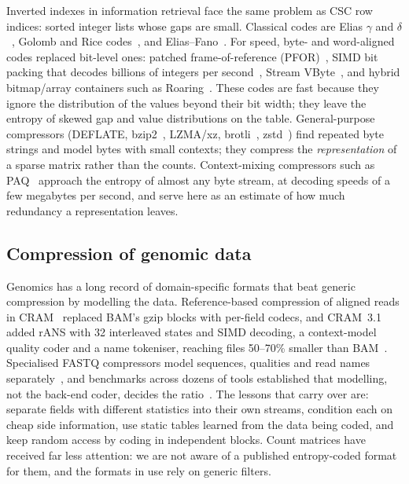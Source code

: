 Inverted indexes in information retrieval face the same problem as CSC row indices: sorted integer lists whose gaps
are small. Classical codes are Elias $\gamma$ and $\delta$~\cite{elias1975universal}, Golomb and Rice
codes~\cite{golomb1966run,rice1979some}, and Elias--Fano~\cite{vigna2013quasi}. For speed, byte- and word-aligned codes
replaced bit-level ones: patched frame-of-reference (PFOR)~\cite{zukowski2006super}, SIMD bit packing that decodes
billions of integers per second~\cite{lemire2015decoding}, Stream VByte~\cite{lemire2018stream}, and hybrid
bitmap/array containers such as Roaring~\cite{chambi2016better}. These codes are fast because they ignore the
distribution of the values beyond their bit width; they leave the entropy of skewed gap and value distributions on
the table. General-purpose compressors (DEFLATE, bzip2~\cite{burrows1994block}, LZMA/xz, brotli~\cite{alakuijala2016brotli},
zstd~\cite{collet2021zstd}) find repeated byte strings and model bytes with small contexts; they compress the
\emph{representation} of a sparse matrix rather than the counts. Context-mixing compressors such as
PAQ~\cite{mahoney2005adaptive} approach the entropy of almost any byte stream, at decoding speeds of a few megabytes per
second, and serve here as an estimate of how much redundancy a representation leaves.

\subsection{Compression of genomic data}

Genomics has a long record of domain-specific formats that beat generic compression by modelling the data. Reference-based
compression of aligned reads in CRAM~\cite{fritz2011efficient} replaced BAM's gzip blocks with per-field codecs, and
CRAM~3.1 added rANS with 32 interleaved states and SIMD decoding, a context-model quality coder and a name
tokeniser, reaching files 50--70\% smaller than BAM~\cite{bonfield2022cram}. Specialised FASTQ compressors model
sequences, qualities and read names separately~\cite{bonfield2013compression,chandak2019spring}, and benchmarks across
dozens of tools established that modelling, not the back-end coder, decides the ratio~\cite{numanagic2016comparison,hernaez2019genomic}.
The lessons that carry over are: separate fields with different statistics into their own streams, condition each
on cheap side information, use static tables learned from the data being coded, and keep random access by coding in
independent blocks. Count matrices have received far less attention: we are not aware of a published entropy-coded
format for them, and the formats in use rely on generic filters.

